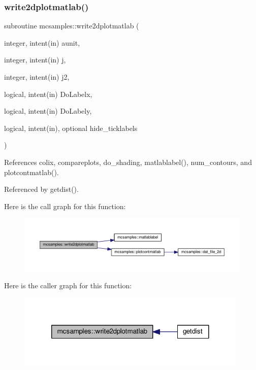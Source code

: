 \subsubsection{\texorpdfstring{write2dplotmatlab()}{write2dplotmatlab()}}
{\footnotesize\ttfamily subroutine mcsamples\+::write2dplotmatlab (\begin{DoxyParamCaption}\item[{integer, intent(in)}]{aunit,  }\item[{integer, intent(in)}]{j,  }\item[{integer, intent(in)}]{j2,  }\item[{logical, intent(in)}]{Do\+Labelx,  }\item[{logical, intent(in)}]{Do\+Labely,  }\item[{logical, intent(in), optional}]{hide\+\_\+ticklabels }\end{DoxyParamCaption})}



References colix, compareplots, do\+\_\+shading, matlablabel(), num\+\_\+contours, and plotcontmatlab().



Referenced by getdist().

Here is the call graph for this function\+:
\nopagebreak
\begin{figure}[H]
\begin{center}
\leavevmode
\includegraphics[width=350pt]{namespacemcsamples_a6ac9a19d5b3622b2a2dea19257a37c36_cgraph}
\end{center}
\end{figure}
Here is the caller graph for this function\+:
\nopagebreak
\begin{figure}[H]
\begin{center}
\leavevmode
\includegraphics[width=312pt]{namespacemcsamples_a6ac9a19d5b3622b2a2dea19257a37c36_icgraph}
\end{center}
\end{figure}
\mbox{\label{namespacemcsamples_a7fb178ee92298048973cca975336489e}} 
